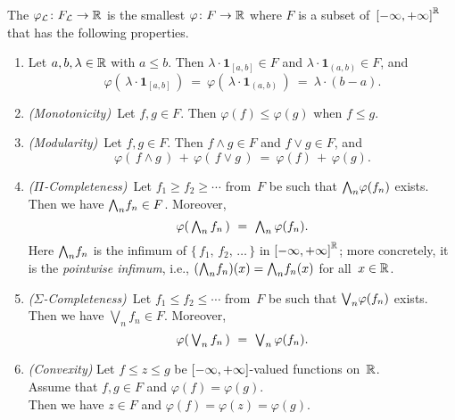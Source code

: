 \documentclass[main.tex]{subfiles}
\begin{document}
\begin{dfn}
\label{D:lebesgue-integral}
The 
$\varphi_{\mathcal{L}} \colon F_{\mathcal{L}} \rightarrow \mathbb{R}$
is the smallest  $\varphi\colon F \rightarrow \mathbb{R}$
where $F$ is a subset of~${[-\infty,+\infty]}^{\mathbb{R}}$
that has the following properties.
\begin{enumerate}
\item
\label{prop:integral-1}
Let $a,b,\lambda\in\mathbb{R}$ with $a\leq b$. 
Then $\lambda\cdot\mathbf{1}_{[a,b]}\in F$
and $\lambda\cdot\mathbf{1}_{(a,b)}\in F$,
and
\begin{equation*}
\varphi(\,\lambda\cdot \mathbf{1}_{[a,b]}\,)
\ =\ \varphi(\,\lambda\cdot \mathbf{1}_{(a,b)}\,)
\ =\ \lambda\cdot(b-a).
\end{equation*}

\item
\label{prop:integral-2}
\textit{(Monotonicity)}\ 
Let $f,g\in F$.
Then $\varphi(f)\leq \varphi(g)$
when  $f\leq g$.

\item
\label{prop:integral-3}
\textit{(Modularity)}\ 
Let $f,g\in F$.
Then $f\wedge g\in F$ and $f \vee g \in F$, and
\begin{equation*}
\varphi(\,f\wedge g\,)\,+\,\varphi(\,f\vee g\,)\ =\ \varphi(f)\,+\,\varphi(g).
\end{equation*}

\item
\label{prop:integral-4}
\textit{($\Pi$-Completeness)}\ 
Let $f_1 \geq f_2 \geq \dotsb$
from~$F$ be such that $\textstyle{\bigwedge}_n \varphi(f_n)$ exists.\\
Then we have $\textstyle{\bigwedge}_n f_n \in F$.
Moreover,
\begin{equation*}
\varphi(\, \textstyle{ \bigwedge_n f_n }\,) \ =\ \textstyle{\bigwedge}_n \,\varphi(f_n).
\end{equation*}
Here $\textstyle{\bigwedge}_n f_n$
is the infimum of $\{\,f_1,\,f_2,\,\dotsc\,\}$ in ${[-\infty,+\infty]}^{\mathbb{R}}$;
more concretely,
it is the \emph{pointwise infimum}, i.e., $(\textstyle{\bigwedge}_n f_n)(x) = \textstyle{\bigwedge}_n f_n(x)$
for all~$x\in \mathbb{R}$.

\item
\label{prop:integral-5}
\textit{($\Sigma$-Completeness)}\ 
Let $f_1 \leq f_2 \leq \dotsb$
from~$F$ 
be such that $\textstyle{\bigvee}_n \varphi(f_n)$ exists.\\
Then we have $\bigvee_n f_n \in F$.
Moreover,
\begin{equation*}
\varphi(\, \textstyle{ \bigvee_n f_n }\,) \ =\ \textstyle{\bigvee}_n \,\varphi(f_n).
\end{equation*}

\item
\label{prop:integral-6}
\textit{(Convexity)}
Let $f\leq z \leq g$ be ${[-\infty,+\infty]}$-valued functions on~$\mathbb{R}$.\\
Assume that $f,g\in F$ and $\varphi(f)=\varphi(g)$.\\
Then we have $z\in F$ and $\varphi(f) = \varphi(z)= \varphi(g)$.
\end{enumerate}
\end{dfn}
\end{document}
